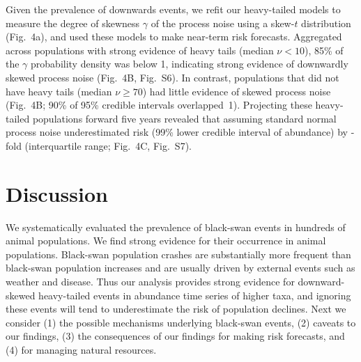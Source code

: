 \documentclass[9pt,twocolumn,twoside]{pnas-new}
\newcommand{\figskewnu}{{6}}
\newcommand{\figskewprojections}{{7}}
\begin{document}
Given the prevalence of downwards events, we refit our heavy-tailed models to
measure the degree of skewness \(\gamma\) of the process noise using a skew-$t$
distribution (Fig.~4a), and used these models to make near-term risk forecasts.
Aggregated across populations with strong evidence of heavy tails (median \(\nu
< 10\)), 85\% of the \(\gamma\) probability density was below 1, indicating
strong evidence of downwardly skewed process noise (Fig.~4B,
Fig.~S\figskewnu). In contrast, populations that did not have heavy
tails (median \(\nu \geq 70\)) had little evidence of skewed process noise
(Fig.~4B; 90\% of 95\% credible intervals overlapped~1). Projecting these
heavy-tailed populations forward five years revealed that assuming standard
normal process noise underestimated risk (99\% lower credible interval of
abundance) by \crashUnderRange-fold (interquartile range; Fig.~4C,
Fig.~S\figskewprojections).

\section*{Discussion}

We systematically evaluated the prevalence of black-swan events in hundreds of
animal populations.
We find strong evidence for their occurrence in animal populations. Black-swan
population crashes are substantially more frequent
than black-swan population
increases and are usually driven by external events such as weather and
disease.
Thus our analysis provides strong evidence
for downward-skewed heavy-tailed events in abundance time series of higher
taxa, and ignoring these events will tend to underestimate the risk of
population declines.
Next we consider
(1) the possible mechanisms underlying black-swan events,
(2) caveats to our findings,
(3) the consequences of our findings for making risk forecasts, and
(4) for managing natural resources.
\end{document}
